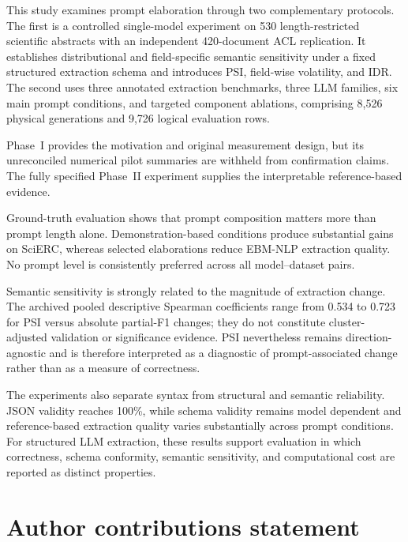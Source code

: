 \documentclass[fleqn,10pt]{wlscirep-authoryear}
\begin{document}
This study examines prompt elaboration through two complementary protocols. The
first is a controlled single-model experiment on 530 length-restricted scientific
abstracts with an independent 420-document ACL replication. It establishes
distributional and field-specific semantic sensitivity under a fixed structured
extraction schema and introduces PSI, field-wise volatility, and IDR. The second
uses three annotated extraction benchmarks, three LLM families, six main prompt
conditions, and targeted component ablations, comprising 8,526 physical
generations and 9,726 logical evaluation rows.

Phase~I provides the motivation and original measurement design, but its
unreconciled numerical pilot summaries are withheld from confirmation claims.
The fully specified Phase~II experiment supplies the interpretable
reference-based evidence.

Ground-truth evaluation shows that prompt composition matters more than prompt
length alone. Demonstration-based conditions produce substantial gains on SciERC,
whereas selected elaborations reduce EBM-NLP extraction quality. No prompt level
is consistently preferred across all model--dataset pairs.

Semantic sensitivity is strongly related to the magnitude of extraction change.
The archived pooled descriptive Spearman coefficients range from 0.534 to
0.723 for PSI versus absolute partial-F1 changes; they do not constitute
cluster-adjusted validation or significance evidence. PSI nevertheless remains
direction-agnostic and is therefore interpreted as a diagnostic of prompt-associated
change rather than as a measure of correctness.

The experiments also separate syntax from structural and semantic reliability.
JSON validity reaches 100\%, while schema validity remains model dependent and
reference-based extraction quality varies substantially across prompt conditions.
For structured LLM extraction, these results support evaluation in which
correctness, schema conformity, semantic sensitivity, and computational cost are
reported as distinct properties.



\section*{Author contributions statement}
\end{document}
